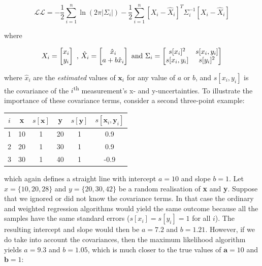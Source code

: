 \begin{refsection}
\begin{equation}
  \mathcal{LL} = -\frac{1}{2} \sum\limits_{i=1}^{n} \ln\left(2 \pi
  |\Sigma_i| \right) -\frac{1}{2} \sum\limits_{i=1}^{n}
  \left[X_i-\hat{X}_i\right]^T \Sigma_i^{-1}
  \left[X_i-\hat{X}_i\right]
  \label{eq:Ly}
\end{equation}

\noindent where

\begin{equation}
  X_i = \left[
    \begin{array}{@{}c@{}}
      x_i\\
      y_i\\
    \end{array}
    \right]
  \mbox{~,~}
  \hat{X}_i = \left[
    \begin{array}{@{}c@{}}
      \hat{x}_i \\
      a + b \hat{x}_i
    \end{array}
    \right]
  \mbox{~and~}
  \Sigma_i = \left[
    \begin{array}{@{}cc@{}}
      s[x_i]^2 & s[x_i,y_i] \\
      s[x_i,y_i] & s[y_i]^2
    \end{array}
    \right]
\end{equation}

\noindent where $\hat{x}_i$ are the \emph{estimated} values of
$\mathbf{x}_i$ for any value of $a$ or $b$, and $s[x_i,y_i]$ is the
covariance of the $i$\textsuperscript{th} measurement's x- and
y-uncertainties. To illustrate the importance of these covariance
terms, consider a second three-point example:

\begin{center}
\begin{tabular}{cccccc}
  $i$ & \textbf{x} & $s[\boldsymbol{x}]$ & \textbf{y} &
  $s[\boldsymbol{y}]$ & $s[\boldsymbol{x}_i,\boldsymbol{y}_i]$ \\
  \hline
  1 & 10 & 1 & 20 & 1 & 0.9 \\
  2 & 20 & 1 & 30 & 1 & 0.9 \\
  3 & 30 & 1 & 40 & 1 & -0.9
\end{tabular}
\end{center}

\noindent which again defines a straight line with intercept $a = 10$
and slope $b = 1$. Let $x = \{10,20,28\}$ and $y = \{20,30,42\}$ be a
random realisation of \textbf{x} and \textbf{y}. Suppose that we
ignored or did not know the covariance terms. In that case the
ordinary and weighted regression algorithms would yield the same
outcome because all the samples have the same standard errors ($s[x_i]
= s[y_i] = 1$ for all $i$). The resulting intercept and slope would
then be $a = 7.2$ and $b = 1.21$. However, if we do take into account
the covariances, then the maximum likelihood algorithm yields $a =
9.3$ and $b = 1.05$, which is much closer to the true values of
$\boldsymbol{a} = 10$ and $\boldsymbol{b} = 1$:


\end{refsection}
